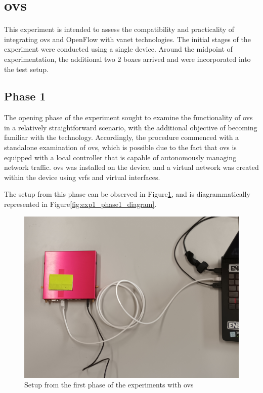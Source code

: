 \section[OvS]{\gls{ovs}}
This experiment is intended to assess the compatibility and practicality of integrating \gls{ovs} and OpenFlow with \gls{vanet} technologies. The initial stages of the experiment were conducted using a single device. Around the midpoint of experimentation, the additional two 2 boxes arrived and were incorporated into the test setup.

\subsection{Phase 1}
The opening phase of the experiment sought to examine the functionality of \gls{ovs} in a relatively straightforward scenario, with the additional objective of becoming familiar with the technology. Accordingly, the procedure commenced with a standalone examination of \gls{ovs}, which is possible due to the fact that \gls{ovs} is equipped with a local controller that is capable of autonomously managing network traffic. \gls{ovs} was installed on the device, and a virtual network was created within the device using \glspl{vrf} and virtual interfaces.

The setup from this phase can be observed in Figure\ref{fig:exp1_phase1_setup}, and is diagrammatically represented in Figure\ref{fig:exp1_phase1_diagram}.

\begin{figure}
	\centering
	\includegraphics[width=\textwidth]{Chapters/Figures/tests/ovs_phase_1/20241122_155830.jpg}
	\caption{Setup from the first phase of the experiments with \gls{ovs}}
	\label{fig:exp1_phase1_setup}
\end{figure}

